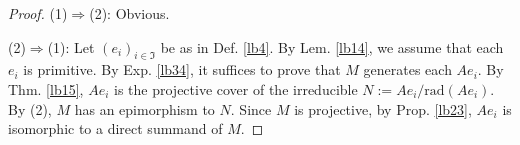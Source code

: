 \documentclass[11pt,b5paper,notitlepage]{article}
\theoremstyle{definition}
\theoremstyle{plain}
\newtheorem{pp}[df]{Proposition}
\newcommand{\fk}{\mathfrak}
\newcommand{\mc}{\mathcal}
\newcommand{\scr}{\mathscr}
\newcommand{\Coh}{\mathrm{Coh}_{\mathrm L}}
\newcommand{\rad}{\mathrm{rad}}
\numberwithin{equation}{section}
\begin{document}
\begin{proof}
(1)$\Rightarrow$(2): Obvious.

(2)$\Rightarrow$(1): Let $(e_i)_{i\in\fk I}$ be as in Def. \ref{lb4}. By Lem. \ref{lb14}, we assume that each $e_i$ is primitive. By Exp. \ref{lb34}, it suffices to prove that $M$ generates each $Ae_i$. By Thm. \ref{lb15}, $Ae_i$ is the projective cover of the irreducible $N:=Ae_i/\rad(Ae_i)$. By (2), $M$ has an epimorphism to $N$. Since $M$ is projective, by Prop. \ref{lb23}, $Ae_i$ is isomorphic to a direct summand of $M$.
\end{proof}



\begin{comment}
\begin{pp}
Let $\mc E$ be a set of idempotents of $A$. Then the following are equivalent.
\begin{enumerate}[label=(\arabic*)]
\item $\scr S:=\{Ae:e\in\mc E\}$ generates $\Coh(A)$.
\item For any primitive idempotent $p\in A$, there exists $e\in\mc E$ such that $p$ is equivalent to a sub-idempotent of $e$.\footnote{Namely, there is an idempotent $e'\in A$ such that $e'\leq e$ and $p\simeq e'$.} 
\end{enumerate}
\end{pp}


\begin{proof}
(2)$\Rightarrow$(1): By Def. \ref{lb26}, any $M\in\Coh(A)$ is a quotient of a finite direct sum of modules of the form $Ap$ where $p\in A$ is an idempotent. Therefore, it suffices to prove that $\scr S$ generates each $Ap$. Since $\dim pAp<+\infty$ (Rem. \ref{lb14}), $p$ is a finite sum of primitive idempotents. Therefore, it suffices to assume that $p$ is primitive. Then there exists $e\in\mc E$ such that $p$ is isomorphic to a sub-idempotent of $e$. Therefore $Ap$ is a quotient of $Ae$. This proves that $\scr S$ generates $Ap$.

(1)$\Rightarrow$(2): By Thm. \ref{lb15}, $N:=Ap/\rad(Ap)$ is irreducible with projective cover $Ap$. Since $\scr S$ generates $N$, $N$ has an epimorphism from a direct sum of members of $\scr S$. Since $N$ is irreducible, there exists $e\in\mc E$ and an epimorphism $Ae\rightarrow N$. Since $Ae$ is projective, by Prop. \ref{lb23}, $Ap$ is isomorphic to a direct summand of $Ae$. This is equivalent to saying that $p$ is isomorphic to a sub-idempotent of $e$.
\end{proof}

\end{comment}
\end{document}
